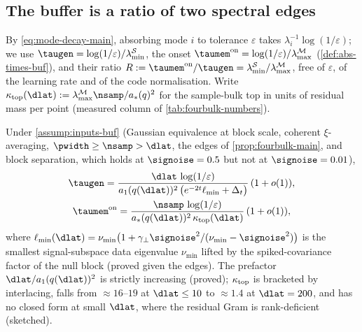 \subsection{The buffer is a ratio of two spectral edges}
\label{sec:theory-buffer}

By \eqref{eq:mode-decay-main}, absorbing mode $i$ to tolerance $\varepsilon$ takes $\lambda_i^{-1}\log(1/\varepsilon)$; we use $\taugen=\log(1/\varepsilon)/\lambda^{\mathcal S}_{\min}$, the onset $\taumem^{\rm on}=\log(1/\varepsilon)/\lambda^{\mathcal M}_{\max}$ (\cref{def:abs-times-buf}), and their ratio $R:=\taumem^{\rm on}/\taugen=\lambda^{\mathcal S}_{\min}/\lambda^{\mathcal M}_{\max}$, free of $\varepsilon$, of the learning rate and of the code normalisation. Write $\kappa_{\rm top}(\dlat):=\lambda^{\mathcal M}_{\max}\nsamp/a_*(q)^2$ for the sample-bulk top in units of residual mass per point (measured column of \cref{tab:fourbulk-numbers}).

\begin{proposition}\label{prop:buffer-main}
Under \cref{assump:inputs-buf} (Gaussian equivalence at block scale, coherent $\xi$-averaging, $\pwidth\ge\nsamp>\dlat$, the edges of \cref{prop:fourbulk-main}, and block separation, which holds at $\signoise=0.5$ but not at $\signoise=0.01$),
\begin{gather}
\taugen=\frac{\dlat\,\log(1/\varepsilon)}{a_1(q(\dlat))^2\,\bigl(e^{-2t}\ell_{\min}+\Delta_t\bigr)}\,(1+o(1)),\label{eq:tau-scalings-buf}\\
\taumem^{\rm on}=\frac{\nsamp\,\log(1/\varepsilon)}{a_*(q(\dlat))^2\,\kappa_{\rm top}(\dlat)}\,(1+o(1)),\label{eq:tauon-main}
\end{gather}
where $\ell_{\min}(\dlat)=\nu_{\min}\bigl(1+\gamma_\perp\signoise^2/(\nu_{\min}-\signoise^2)\bigr)$ is the smallest signal-subspace data eigenvalue $\nu_{\min}$ lifted by the spiked-covariance factor of the null block \citep{baik2005phase} (proved given the edges). The prefactor $\dlat/a_1(q(\dlat))^2$ is strictly increasing (proved); $\kappa_{\rm top}$ is bracketed by interlacing, falls from $\approx16$--$19$ at $\dlat\le10$ to $\approx1.4$ at $\dlat=200$, and has no closed form at small $\dlat$, where the residual Gram is rank-deficient (sketched).
\end{proposition}


